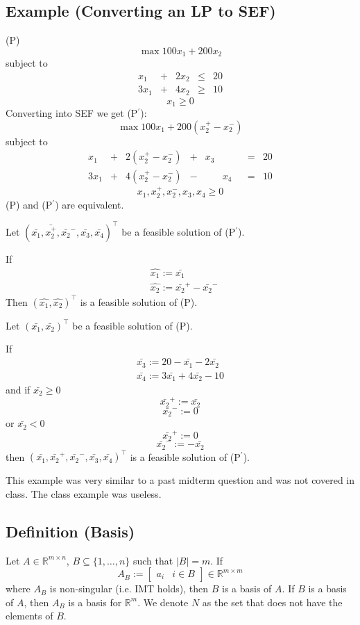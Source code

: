 \subsection{Example (Converting an LP to SEF)}
(P)
\[\max 100x_1+200x_2\]
subject to
\[
\begin{array}{ccccc}
    x_1 & + & 2x_2 & \le & 20\\
    3x_1 & + & 4x_2 & \ge & 10
\end{array}
\]
\[x_1 \ge 0\]
Converting into SEF we get (P$^\prime$):
\[\max 100x_1+200(x_2^+-x_2^-)\]
subject to
\[
\begin{array}{ccccccccc}
    x_1 & + & 2(x_2^+-x_2^-) & + & x_3 & & & = & 20\\
    3x_1 & + & 4(x_2^+-x_2^-) & - & & x_4 & & = & 10
\end{array}
\]
\[x_1,x_2^+,x_2^-,x_3,x_4\ge 0\]
(P) and (P$^\prime$) are equivalent.

Let
$(\bar{x_1}, \bar{x_2^+}, \bar{x_2}^-, \bar{x_3}, \bar{x_4})^\top$
be a feasible solution of (P$^\prime$).


If
\begin{align*}
    &\hat{x_1}:=\bar{x_1}\\
    &\hat{x_2}:=\bar{x_2}^+-\bar{x_2}^-
\end{align*}
Then 
$(\hat{x_1},\hat{x_2})^\top$
is a feasible solution of (P).

Let
$(\bar{x_1}, \bar{x_2})^\top$
be a feasible solution of (P).

If
\begin{align*}
    \bar{x_3}:=20-\bar{x_1}-2\bar{x_2}\\
    \bar{x_4}:=3\bar{x_1}+4\bar{x_2}-10
\end{align*}
and 
if $\bar{x_2}\ge 0$
\[\bar{x_2}^+:=\bar{x_2}\]
\[\bar{x_2}^-:=0\]
or $\bar{x_2}< 0$
\[\bar{x_2}^+:=0\]
\[\bar{x_2}^-:=-\bar{x_2}\]
then $(\bar{x_1},\bar{x_2}^+,\bar{x_2}^-,\bar{x_3},\bar{x_4})^\top$
is a feasible solution of (P$^\prime$).
\begin{remark}
    This example was very similar to a past midterm question and was not covered in class.
    The class example was useless.
\end{remark}

\begin{defbox}
    \subsection{Definition (Basis)}
    Let $A\in \mathbb{R}^{m\times n}$, $B\subseteq\{1,\dots,n\}$ such that $|B|=m$. If
    \[A_B:= \left[\begin{array}{c|c} a_i & i\in B \end{array}\right]
        \in \mathbb{R}^{m\times m}
    \]
    where $A_B$ is non-singular (i.e. IMT holds), then $B$ is a basis of $A$.
    If $B$ is a basis of $A$, then $A_B$ is a basis for $\mathbb{R}^m$. We
    denote $N$ as the set that does not have the elements of $B$.
\end{defbox}


